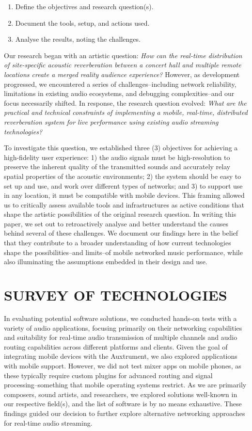 \documentclass[fleqn]{jaes}
\begin{document}
\begin{enumerate}
    \item Define the objectives and research question(s).
    \item Document the tools, setup, and actions used.
    \item Analyse the results, noting the challenges.
\end{enumerate}

Our research began with an artistic question: \textit{How can the real-time distribution of site-specific acoustic reverberation between a concert hall and multiple remote locations create a merged reality audience experience?} However, as development progressed, we encountered a series of challenges--including network reliability, limitations in existing audio ecosystems, and debugging complexities--and our focus necessarily shifted. In response, the research question evolved: \textit{What are the practical and technical constraints of implementing a mobile, real-time, distributed reverberation system for live performance using existing audio streaming technologies?}

To investigate this question, we established three (3) objectives for achieving a high-fidelity user experience: 1) the audio signals must be high-resolution to preserve the inherent quality of the transmitted sounds and accurately relay spatial properties of the acoustic environments; 2) the system should be easy to set up and use, and work over different types of networks; and 3) to support use in any location, it must be compatible with mobile devices. This framing allowed us to critically assess available tools and infrastructures as active conditions that shape the artistic possibilities of the original research question. In writing this paper, we set out to retroactively analyse and better understand the causes behind several of these challenges. We document our findings here in the belief that they contribute to a broader understanding of how current technologies shape the possibilities--and limits--of mobile networked music performance, while also illuminating the assumptions embedded in their design and use.

\section{SURVEY OF TECHNOLOGIES}
In evaluating potential software solutions, we conducted hands-on tests with a variety of audio applications, focusing primarily on their networking capabilities and suitability for real-time audio transmission of multiple channels and audio routing capabilities across different platforms and clients. Given the goal of integrating mobile devices with the Auxtrument, we also explored applications with mobile support. However, we did not test mixer apps on mobile phones, as these typically require custom plugins for advanced routing and signal processing--something that mobile operating systems restrict. As we are primarily composers, sound artists, and researchers, we explored solutions well-known in our respective field(s), and the list of software is by no means exhaustive. These findings guided our decision to further explore alternative networking approaches for real-time audio streaming.
\end{document}
